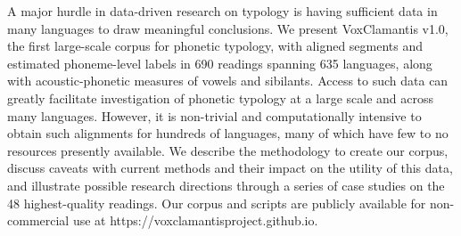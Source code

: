 A major hurdle in data-driven research on typology is having sufficient data in many languages to draw meaningful conclusions. We present VoxClamantis v1.0, the first large-scale corpus for phonetic typology, with aligned segments and estimated phoneme-level labels in 690 readings spanning 635 languages, along with acoustic-phonetic measures of vowels and sibilants. Access to such data can greatly facilitate investigation of phonetic typology at a large scale and across many languages. However, it is non-trivial and computationally intensive to obtain such alignments for hundreds of languages, many of which have few to no resources presently available. We describe the methodology to create our corpus, discuss caveats with current methods and their impact on the utility of this data, and illustrate possible research directions through a series of case studies on the 48 highest-quality readings. Our corpus and scripts are publicly available for non-commercial use at https://voxclamantisproject.github.io.
